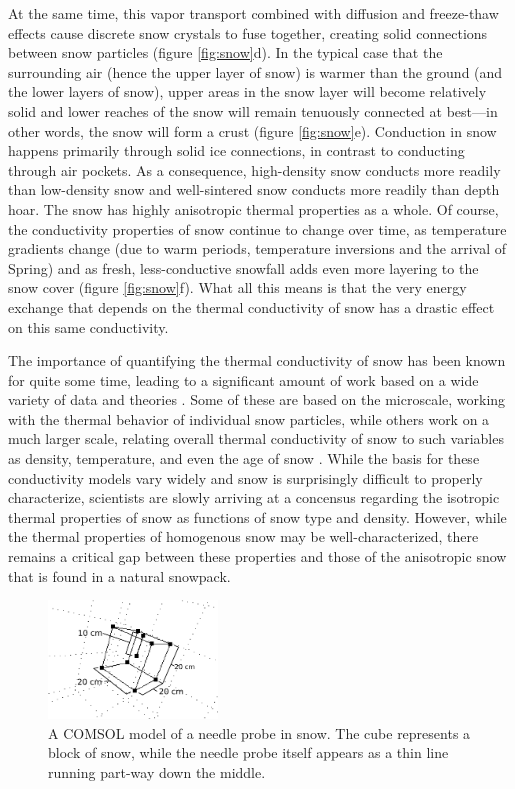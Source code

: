 \documentclass[12pt, letterpaper]{article}
\begin{document}
At the same time, this vapor transport combined with diffusion and freeze-thaw effects cause discrete snow crystals to fuse together, creating solid connections between snow particles (figure \ref{fig:snow}d). In the typical case that the surrounding air (hence the upper layer of snow) is warmer than the ground (and the lower layers of snow), upper areas in the snow layer will become relatively solid and lower reaches of the snow will remain tenuously connected at best---in other words, the snow will form a crust (figure \ref{fig:snow}e).  Conduction in snow happens primarily through solid ice connections, in contrast to conducting through air pockets. As a consequence, high-density snow conducts more readily than low-density snow and well-sintered snow conducts more readily than depth hoar. The snow has highly anisotropic thermal properties as a whole. Of course, the conductivity properties of snow continue to change over time, as temperature gradients change (due to warm periods, temperature inversions and the arrival of Spring) and as fresh, less-conductive snowfall adds even more layering to the snow cover (figure \ref{fig:snow}f). What all this means is that the very energy exchange that depends on the thermal conductivity of snow has a drastic effect on this same conductivity.

The importance of quantifying the thermal conductivity of snow has been known for quite some time, leading to a significant amount of work based on a wide variety of data and theories \cite{sturm3,conductivitymodels}. Some of these are based on the microscale, working with the thermal behavior of individual snow particles, while others work on a much larger scale, relating overall thermal conductivity of snow to such variables as density, temperature, and even the age of snow \cite{mustructure2,sturm1}.  While the basis for these conductivity models vary widely and snow is surprisingly difficult to properly characterize, scientists are slowly arriving at a concensus regarding the isotropic thermal properties of snow as functions of snow type and density. However, while the thermal properties of homogenous snow may be well-characterized, there remains a critical gap between these properties and those of the anisotropic snow that is found in a natural snowpack.

\begin{figure}
\centering
\label{fig:needleprobe}
\includegraphics[width=0.4\textwidth]{simple.png}
\caption{A COMSOL model of a needle probe in snow. The cube represents a block of snow, while the needle probe itself appears as a thin line running part-way down the middle.}
\end{figure}
\end{document}
